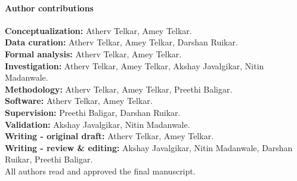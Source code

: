 \documentclass[10pt,a4paper]{article}
\begin{document}
\paragraph*{Author contributions}
\noindent\textbf{Conceptualization:} Atherv Telkar, Amey Telkar.\\
\textbf{Data curation:} Atherv Telkar, Amey Telkar, Darshan Ruikar.\\
\textbf{Formal analysis:} Atherv Telkar, Amey Telkar.\\
\textbf{Investigation:} Atherv Telkar, Amey Telkar, Akshay Javalgikar, Nitin Madanwale.\\
\textbf{Methodology:} Atherv Telkar, Amey Telkar, Preethi Baligar.\\
\textbf{Software:} Atherv Telkar, Amey Telkar.\\
\textbf{Supervision:} Preethi Baligar, Darshan Ruikar.\\
\textbf{Validation:} Akshay Javalgikar, Nitin Madanwale.\\
\textbf{Writing - original draft:} Atherv Telkar, Amey Telkar.\\
\textbf{Writing - review \& editing:} Akshay Javalgikar, Nitin Madanwale, Darshan Ruikar, Preethi Baligar.\\
All authors read and approved the final manuscript.
\end{document}
